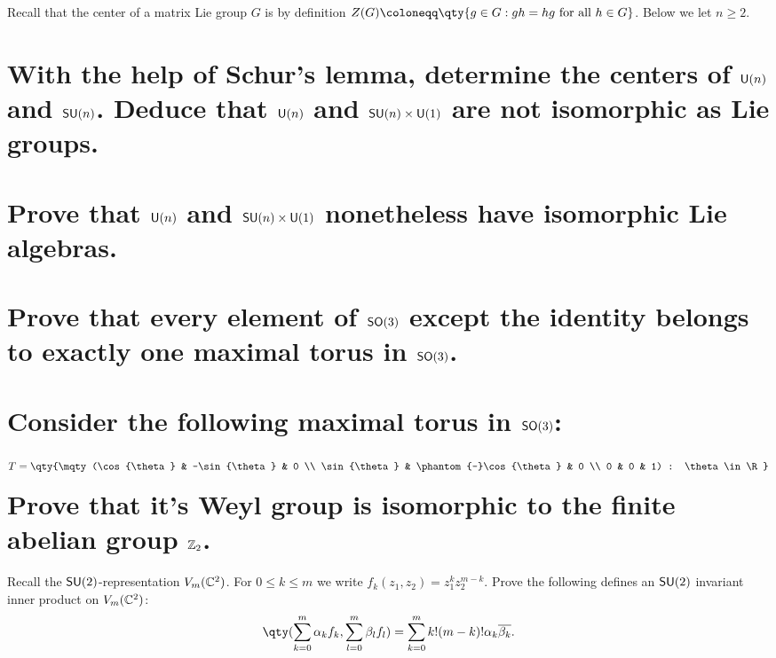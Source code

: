 \documentclass[
	pages,
	boxes,
	color=WildStrawberry
]{homework}
\begin{document}
\begin{problem}
Recall that the center of a matrix Lie group $G$ is by definition $Z(G)\defeq \qty{g\in G : gh = hg \text{ for all } h\in G}$. Below we let $n\geq 2$.
\begin{parts}
	\part{With the help of Schur's lemma, determine the centers of $\mathsf{U}(n)$ and $\mathsf{SU}(n)$. Deduce that $\mathsf{U}(n)$ and $\mathsf{SU}(n)\times\mathsf{U}(1)$ are not isomorphic as Lie groups.}\label{part:1a}
	\part{Prove that $\mathsf{U}(n)$ and $\mathsf{SU}(n)\times\mathsf{U}(1)$ nonetheless have isomorphic Lie algebras.}\label{part:1b}
\end{parts}
\end{problem}

\begin{solution}

\end{solution}

\begin{problem}
\begin{parts}
	\part{Prove that every element of $\mathsf{SO}(3)$ except the identity belongs to exactly one maximal torus in $\mathsf{SO}(3)$.}\label{part:2a}
	\part{Consider the following maximal torus in $\mathsf{SO}(3)$:
		\begin{equation*}
			T = \qty{\mqty(\cos{\theta} & -\sin{\theta} & 0 \\ \sin{\theta} & \phantom{-}\cos{\theta} & 0 \\ 0 & 0 & 1) : \theta\in\R}
		\end{equation*}
		Prove that it's Weyl group is isomorphic to the finite abelian group $\mathbb{Z}_2$.}\label{part:2b}
\end{parts}
\end{problem}

\begin{solution}

\end{solution}

\begin{problem}
Recall the $\mathsf{SU}(2)$-representation $V_m(\mathbb{C}^2)$. For $0\leq k \leq m$ we write $f_k(z_1, z_2) = z_1^k z_2^{m - k}$. Prove the following defines an $\mathsf{SU}(2)$ invariant inner product on $V_m(\mathbb{C}^2)$:
\begin{equation*}
	\qty(\sum_{k = 0}^m \alpha_k f_k, \sum_{l = 0}^m\beta_l f_l) = \sum_{k = 0}^m k!(m - k)!\alpha_k\overline{\beta_k}.
\end{equation*}
\end{problem}
\end{document}
